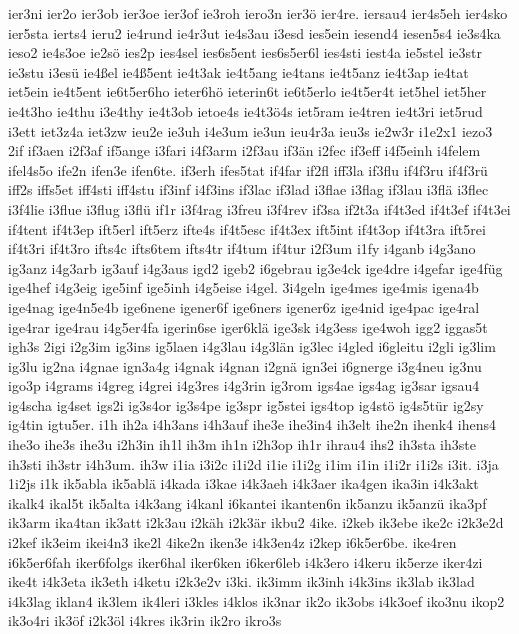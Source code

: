 {ier3ni
ier2o
ier3ob
ier3oe
ier3of
ie3roh
iero3n
ier3ö
ier4re.
iersau4
ier4s5eh
ier4sko
ier5sta
ierts4
ieru2
ie4rund
ie4r3ut
ie4s3au
i3esd
ies5ein
iesend4
iesen5s4
ie3s4ka
ieso2
ie4s3oe
ie2sö
ies2p
ies4sel
ies6s5ent
ies6s5er6l
ies4sti
iest4a
ie5stel
ie3str
ie3stu
i3esü
ie4ßel
ie4ß5ent
ie4t3ak
ie4t5ang
ie4tans
ie4t5anz
ie4t3ap
ie4tat
iet5ein
ie4t5ent
ie6t5er6ho
ieter6hö
ieterin6t
ie6t5erlo
ie4t5er4t
iet5hel
iet5her
ie4t3ho
ie4thu
i3e4thy
ie4t3ob
ietoe4s
ie4t3ö4s
iet5ram
ie4tren
ie4t3ri
iet5rud
i3ett
iet3z4a
iet3zw
ieu2e
ie3uh
i4e3um
ie3un
ieu4r3a
ieu3s
ie2w3r
i1e2x1
iezo3
2if
if3aen
i2f3af
if5ange
i3fari
i4f3arm
i2f3au
if3än
i2fec
if3eff
i4f5einh
i4felem
ifel4s5o
ife2n
ifen3e
ifen6te.
if3erh
ifes5tat
if4far
if2fl
iff3la
if3flu
if4f3ru
if4f3rü
iff2s
iffs5et
iff4sti
iff4stu
if3inf
i4f3ins
if3lac
if3lad
i3flae
i3flag
if3lau
i3flä
i3flec
i3f4lie
i3flue
i3flug
i3flü
if1r
i3f4rag
i3freu
i3f4rev
if3sa
if2t3a
if4t3ed
if4t3ef
if4t3ei
if4tent
if4t3ep
ift5erl
ift5erz
ifte4s
if4t5esc
if4t3ex
ift5int
if4t3op
if4t3ra
ift5rei
if4t3ri
if4t3ro
ifts4c
ifts6tem
ifts4tr
if4tum
if4tur
i2f3um
i1fy
i4ganb
i4g3ano
ig3anz
i4g3arb
ig3auf
i4g3aus
igd2
igeb2
i6gebrau
ig3e4ck
ige4dre
i4gefar
ige4füg
ige4hef
i4g3eig
ige5inf
ige5inh
i4g5eise
i4gel.
3i4geln
ige4mes
ige4mis
igena4b
ige4nag
ige4n5e4b
ige6nene
igener6f
ige6ners
igener6z
ige4nid
ige4pac
ige4ral
ige4rar
ige4rau
i4g5er4fa
igerin6se
iger6klä
ige3sk
i4g3ess
ige4woh
igg2
iggas5t
igh3s
2igi
i2g3im
ig3ins
ig5laen
i4g3lau
i4g3län
ig3lec
i4gled
i6gleitu
i2gli
ig3lim
ig3lu
ig2na
i4gnae
ign3a4g
i4gnak
i4gnan
i2gnä
ign3ei
i6gnerge
i3g4neu
ig3nu
igo3p
i4grams
i4greg
i4grei
i4g3res
i4g3rin
ig3rom
igs4ae
igs4ag
ig3sar
igsau4
ig4scha
ig4set
igs2i
ig3s4or
ig3s4pe
ig3spr
ig5stei
igs4top
ig4stö
ig4s5tür
ig2sy
ig4tin
igtu5er.
i1h
ih2a
i4h3ans
i4h3auf
ihe3e
ihe3in4
ih3elt
ihe2n
ihenk4
ihens4
ihe3o
ihe3s
ihe3u
i2h3in
ih1l
ih3m
ih1n
i2h3op
ih1r
ihrau4
ihs2
ih3sta
ih3ste
ih3sti
ih3str
i4h3um.
ih3w
i1ia
i3i2c
i1i2d
i1ie
i1i2g
i1im
i1in
i1i2r
i1i2s
i3it.
i3ja
1i2js
i1k
ik5abla
ik5ablä
i4kada
i3kae
i4k3aeh
i4k3aer
ika4gen
ika3in
i4k3akt
ikalk4
ikal5t
ik5alta
i4k3ang
i4kanl
i6kantei
ikanten6n
ik5anzu
ik5anzü
ika3pf
ik3arm
ika4tan
ik3att
i2k3au
i2käh
i2k3är
ikbu2
4ike.
i2keb
ik3ebe
ike2c
i2k3e2d
i2kef
ik3eim
ikei4n3
ike2l
4ike2n
iken3e
i4k3en4z
i2kep
i6k5er6be.
ike4ren
i6k5er6fah
iker6folgs
iker6hal
iker6ken
i6ker6leb
i4k3ero
i4keru
ik5erze
iker4zi
ike4t
i4k3eta
ik3eth
i4ketu
i2k3e2v
i3ki.
ik3imm
ik3inh
i4k3ins
ik3lab
ik3lad
i4k3lag
iklan4
ik3lem
ik4leri
i3kles
i4klos
ik3nar
ik2o
ik3obs
i4k3oef
iko3nu
ikop2
ik3o4ri
ik3öf
i2k3öl
i4kres
ik3rin
ik2ro
ikro3s
}
